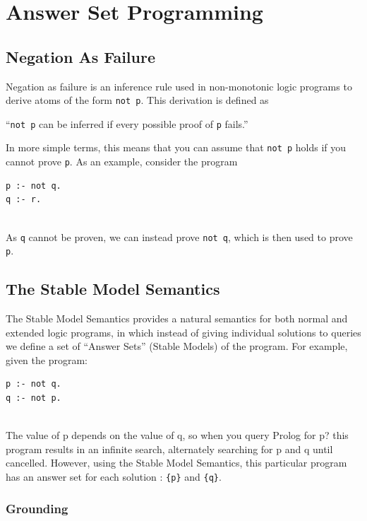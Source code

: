 \section{Answer Set Programming}

\subsection{Negation As Failure}
Negation as failure is an inference rule used in non-monotonic logic programs to derive atoms of the form \lstinline!not p!. This derivation is defined as 
\begin{displayquote}
``\lstinline!not p! can be inferred if every possible proof of \lstinline!p! fails.'' \cite{negAsFailure}
\end{displayquote}
In more simple terms, this means that you can assume that \lstinline!not p! holds if you cannot prove \lstinline!p!. 
As an example, consider the program \\

\begin{lstlisting}
p :- not q.
q :- r.
\end{lstlisting}
\mbox{}\\
As \lstinline!q! cannot be proven, we can instead prove \lstinline!not q!, which is then used to prove \lstinline!p!.

\subsection{The Stable Model Semantics}

The Stable Model Semantics \cite{KRnotes} provides a natural semantics for both normal and extended logic programs, in which instead of giving individual solutions to queries we define a set of ``Answer Sets'' (Stable Models) of the program. For example, given the program: \\

\begin{lstlisting}
p :- not q.
q :- not p.
\end{lstlisting}
\mbox{}\\
The value of p depends on the value of q, so when you query Prolog for p? this program results in an infinite search, alternately searching for p and q until cancelled. However, using the Stable Model Semantics, this particular program has an answer set for each solution : \lstinline!{p}! and \lstinline!{q}!.

\subsubsection{Grounding}

